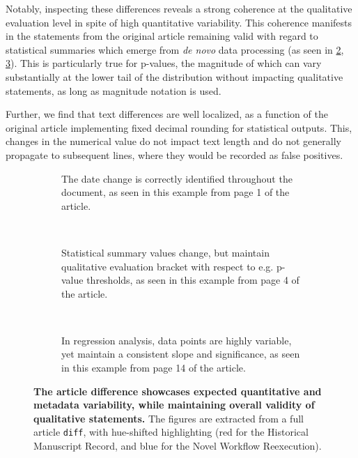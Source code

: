 Notably, inspecting these differences reveals a strong coherence at the qualitative evaluation level in spite of high quantitative variability.
This coherence manifests in the statements from the original article remaining valid with regard to statistical summaries which emerge from  \textit{de novo} data processing (as seen in \ref{fig:diff_text}, \ref{fig:diff_fig}).
This is particularly true for p-values, the magnitude of which can vary substantially at the lower tail of the distribution without impacting qualitative statements, as long as magnitude notation is used.

Further, we find that text differences are well localized, as a function of the original article implementing fixed decimal rounding for statistical outputs.
This, changes in the numerical value do not impact text length and do not generally propagate to subsequent lines, where they would be recorded as false positives.


\begin{figure}
	\centering
	\begin{subfigure}{0.99\textwidth}
		\centering
		\caption{
			The date change is correctly identified throughout the document, as seen in this example from page 1 of the article.
		}
		\label{fig:diff_date}
	\end{subfigure}
	\\
	\begin{subfigure}{0.99\textwidth}
		\centering
		\caption{
			Statistical summary values change, but maintain qualitative evaluation bracket with respect to e.g. p-value thresholds, as seen in this example from page 4 of the article.
		}
		\label{fig:diff_text}
	\end{subfigure}
	\\
	\vspace{1em}
	\begin{subfigure}{0.99\textwidth}
		\centering
		\caption{
			In regression analysis, data points are highly variable, yet maintain a consistent slope and significance, as seen in this example from page 14 of the article.
		}
		\label{fig:diff_fig}
	\end{subfigure}
	\caption{
		\textbf{The article difference showcases expected quantitative and metadata variability, while maintaining overall validity of qualitative statements.}
		The figures are extracted from a full article \texttt{diff}, with hue-shifted highlighting (red for the Historical Manuscript Record, and blue for the Novel Workflow Reexecution).
	}
	\label{fig:diff}
\end{figure}


